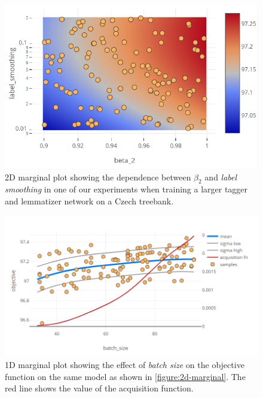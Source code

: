 \begin{figure}
	\begin{center}
		\includegraphics[width=1.0\textwidth]{images/2d-marginal.png}
		\caption{2D marginal plot showing the dependence between $\beta_2$ and \emph{label smoothing} in one of our experiments when training a larger tagger and lemmatizer network on a Czech treebank.}
	\end{center}
\end{figure}
\label{figure:2d-marginal}

\begin{figure}
	\begin{center}
		\includegraphics[width=1.0\textwidth]{images/1d-marginal.png}
		\caption{1D marginal plot showing the effect of \emph{batch size} on the objective function on the same model as shown in \autoref{figure:2d-marginal}. The red line shows the value of the acquisition function.}
	\end{center}
\end{figure}
\label{figure:1d-marginal}


